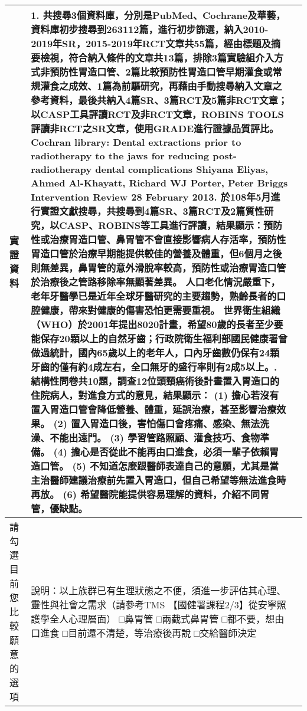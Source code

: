 \documentclass[12pt, a4paper]{article}
\begin{document}
\begin{xltabular}{1.0\linewidth}[c]{|p{2.3cm}|p{12.4cm}|l|}
實證資料 &
  1. 共搜尋3個資料庫，分別是PubMed、Cochrane及華藝，資料庫初步搜尋到263112篇，進行初步篩選，納入2010-2019年SR，2015-2019年RCT文章共55篇，經由標題及摘要檢視，符合納入條件的文章共13篇，排除3篇實驗組介入方式非預防性胃造口管、2篇比較預防性胃造口管早期灌食或常規灌食之成效、1篇為前驅研究，再藉由手動搜尋納入文章之參考資料，最後共納入4篇SR、3篇RCT及5篇非RCT文章；以CASP工具評讀RCT及非RCT文章，ROBINS TOOLS評讀非RCT之SR文章，使用GRADE進行證據品質評比。
Cochran library: Dental extractions prior to radiotherapy to the jaws for reducing post‐radiotherapy dental complications
Shiyana Eliyas, Ahmed Al‐Khayatt, Richard WJ Porter, Peter Briggs
Intervention
Review
28 February 2013. 於108年5月進行實證文獻搜尋，共搜尋到4篇SR、3篇RCT及2篇質性研究，以CASP、ROBINS等工具進行評讀，結果顯示：預防性或治療胃造口管、鼻胃管不會直接影響病人存活率，預防性胃造口管於治療早期能提供較佳的營養及體重，但6個月之後則無差異，鼻胃管的意外滑脫率較高，預防性或治療胃造口管於治療後之管路移除率無顯著差異。\newline
  人口老化情況嚴重下，老年牙醫學已是近年全球牙醫研究的主要趨勢，熟齡長者的口腔健康，帶來對健康的傷害恐怕更需要重視。\newline
    世界衛生組織（WHO）於2001年提出8020計畫，希望80歲的長者至少要能保存20顆以上的自然牙齒；行政院衛生福利部國民健康署曾做過統計，國內65歲以上的老年人，口內牙齒數仍保有24顆牙齒的僅有約4成左右，全口無牙的盛行率則有2成5以上。. 結構性問卷共10題，調查12位頭頸癌術後計畫置入胃造口的住院病人，對進食方式的意見，結果顯示：
(1) 擔心若沒有置入胃造口管會降低營養、體重，延誤治療，甚至影響治療效果。
(2) 置入胃造口後，害怕傷口會疼痛、感染、無法洗澡、不能出遠門。
(3) 學習管路照顧、灌食技巧、食物準備。
(4) 擔心是否從此不能再由口進食，必須一輩子依賴胃造口管。
(5) 不知道怎麼跟醫師表達自己的意願，尤其是當主治醫師建議治療前先置入胃造口，但自己希望等無法進食時再放。
(6) 希望醫院能提供容易理解的資料，介紹不同胃管，優缺點。 &
   \\ \hline
   請勾選目前您比較願意的選項 &
  {\color[HTML]{C0C0C0}說明：以上族群已有生理狀態之不便，須進一步評估其心理、靈性與社會之需求（請參考TMS 【國健署課程2/3】從安寧照護學全人心理層面）}\newline 
□鼻胃管\newline
□兩截式鼻胃管\newline
□都不要，想由口進食\newline
□目前還不清楚，等治療後再說\newline
□交給醫師決定\newline


\end{xltabular}
\end{document}
